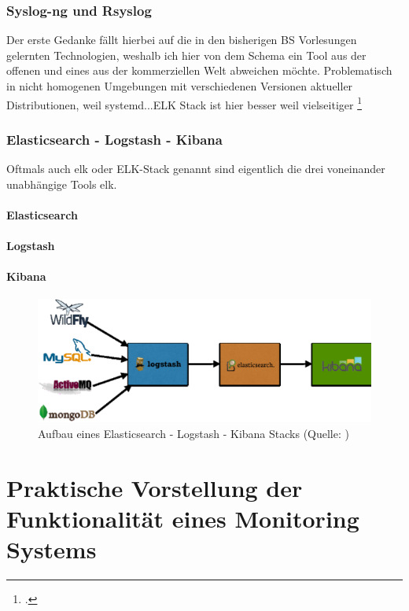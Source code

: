 \documentclass[12pt,a4paper,parskip]{scrreprt}
\begin{document}
	\subsection{Syslog-ng und Rsyslog}
	Der erste Gedanke fällt hierbei auf die in den bisherigen BS Vorlesungen gelernten Technologien, weshalb ich hier von dem Schema ein Tool aus der offenen und eines aus der kommerziellen Welt abweichen möchte.
	Problematisch in nicht homogenen Umgebungen mit verschiedenen Versionen aktueller Distributionen, weil systemd...ELK Stack ist hier besser weil vielseitiger
	\footcite{systemd2015}
	\subsection{Elasticsearch - Logstash - Kibana}
	Oftmals auch \acrshort{elk} oder ELK-Stack genannt sind eigentlich die drei voneinander unabhängige Tools \acrlong{elk}.
	\subsubsection{Elasticsearch}
	\subsubsection{Logstash}
	\subsubsection{Kibana}
	\begin{figure}[h!]
		\centering
		\includegraphics[width=1\textwidth]{pics/elk-stack.eps}
		\caption[Aufbau eines Elasticsearch - Logstash - Kibana Stacks]{Aufbau eines Elasticsearch - Logstash - Kibana Stacks (Quelle: \textcite{elkstackpic})}
	\end{figure}
	\clearpage
	\chapter{Praktische Vorstellung der Funktionalität eines Monitoring Systems}
\end{document}
